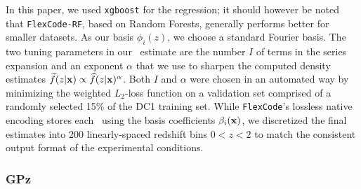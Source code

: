 In this paper, we used \texttt{xgboost} \citep{Chen:16} for the regression; it should however be noted that \texttt{FlexCode-RF}, based on Random Forests, generally performs better for smaller datasets.
As our basis $\phi_{i}(z)$, we choose a standard Fourier basis.
The two tuning parameters in our \pzpdf\ estimate are the number $I$ of terms in the series expansion and an exponent $\alpha$ that we use to sharpen the computed density estimates $\widetilde{f}(z \vert {\mathbf{x}}) \propto \widehat{f}(z \vert {\mathbf{x}})^{\alpha}$.
Both $I$ and $\alpha$ were chosen in an automated way by minimizing the weighted $L_2$-loss function \citep[Eq. 5 in][]{Izbicki:17} on a validation set comprised of a randomly selected 15\% of the DC1 training set.
While \texttt{FlexCode}'s lossless native encoding stores each \pzpdf\ using the basis coefficients $\beta_{i}({\mathbf{x}})$, we discretized the final estimates into 200 linearly-spaced redshift bins $0 < z < 2$ to match the consistent output format of the experimental conditions.

%
%

\subsubsection{GPz}
\label{sec:gpz}

